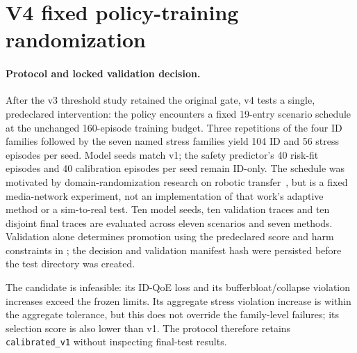 \documentclass[10pt]{article}
\providecommand{\randomizationpath}{generated-randomization}
\begin{document}
\section{V4 fixed policy-training randomization}
\paragraph{Protocol and locked validation decision.}
After the v3 threshold study retained the original gate, v4 tests a single, predeclared intervention: the policy encounters a fixed 19-entry scenario schedule at the unchanged 160-episode training budget. Three repetitions of the four ID families followed by the seven named stress families yield 104 ID and 56 stress episodes per seed. Model seeds match v1; the safety predictor's 40 risk-fit episodes and 40 calibration episodes per seed remain ID-only. The schedule was motivated by domain-randomization research on robotic transfer~\cite{tiboni2023doraemon}, but is a fixed media-network experiment, not an implementation of that work's adaptive method or a sim-to-real test. Ten model seeds, ten validation traces and ten disjoint final traces are evaluated across eleven scenarios and seven methods. Validation alone determines promotion using the predeclared score and harm constraints in ; the decision and validation manifest hash were persisted before the test directory was created.

\begin{table}[t]
\centering\resizebox{\textwidth}{!}{}
\caption{V4 validation metrics and predeclared promotion decision. The candidate must satisfy ID-QoE, ID-risk, aggregate stress-risk and every stress-family constraint, then exceed the v1 selection score by more than 0.005.}
\label{tab:randomization-selection}
\end{table}

The candidate is infeasible: its ID-QoE loss and its bufferbloat/collapse violation increases exceed the frozen limits. Its aggregate stress violation increase is within the aggregate tolerance, but this does not override the family-level failures; its selection score is also lower than v1. The protocol therefore retains \texttt{calibrated\_v1} without inspecting final-test results.

\begin{table}[t]
\centering\resizebox{\textwidth}{!}{}
\caption{V4 validation stress-family risk differences (candidate minus v1), compared with the prespecified maximum increase of 3 percentage points.}
\label{tab:randomization-families}
\end{table}
\end{document}
